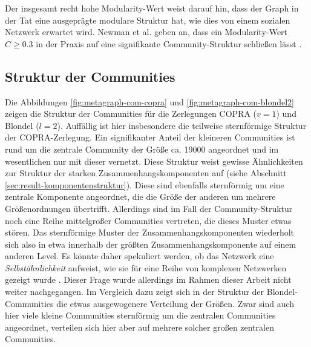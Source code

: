Der insgesamt recht hohe Modularity-Wert weist darauf hin, dass der
Graph in der Tat eine ausgeprägte modulare Struktur hat, wie dies
von einem sozialen Netzwerk erwartet wird. Newman et al. geben an,
dass ein Modularity-Wert $C \ge 0.3$ in der Praxis auf eine
signifikante Community-Struktur schließen lässt \cite{Clauset2004}.

\subsection{Struktur der Communities}
\label{sec:strukt-der-comm}

Die Abbildungen \ref{fig:metagraph-com-copra} und
\ref{fig:metagraph-com-blondel2} zeigen die Struktur der Communities
für die Zerlegungen COPRA ($v=1$) und Blondel ($l=2$). Auffällig
ist hier insbesondere die teilweise sternförmige Struktur der
COPRA-Zerlegung. Ein signifikanter Anteil der kleineren Communities
ist rund um die zentrale Community der Größe ca. 19000 angeordnet
und im wesentlichen nur mit dieser vernetzt. Diese Struktur weist
gewisse Ähnlichkeiten zur Struktur der starken
Zusammenhangskomponenten auf (siehe Abschnitt
\ref{sec:result-komponentenstruktur}). Diese sind ebenfalls
sternförmig um eine zentrale Komponente angeordnet, die die Größe
der anderen um mehrere Größenordnungen übertrifft. Allerdings
sind im Fall der Community-Struktur noch eine Reihe mittelgroßer
Communities vertreten, die dieses Muster etwas stören. Das
sternförmige Muster der Zusammenhangskomponenten wiederholt sich
also in etwa innerhalb der größten Zusammenhangskomponente auf
einem anderen Level. Es könnte daher spekuliert werden, ob das
Netzwerk eine \emph{Selbstähnlichkeit} aufweist, wie sie für eine
Reihe von komplexen Netzwerken gezeigt wurde \cite{Song2005}. Dieser
Frage wurde allerdings im Rahmen dieser Arbeit nicht weiter
nachgegangen. Im Vergleich dazu zeigt sich in der Struktur der
Blondel-Communities die etwas ausgewogenere Verteilung der Größen. Zwar
sind auch hier viele kleine Communities sternförmig um die zentralen
Communities angeordnet, verteilen sich hier aber auf mehrere solcher
großen zentralen Communities.


